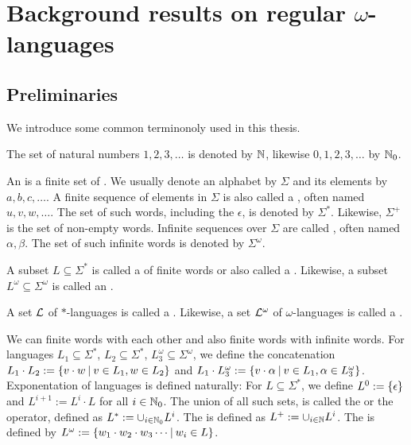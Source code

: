 \section{Background results on regular $\omega$-languages}

\subsection{Preliminaries}
We introduce some common terminonoly used in this thesis.

The set of natural numbers $1,2,3,\dots$ is denoted by $\mathbb{N}$, likewise $0,1,2,3,\dots$ by $\mathbb{N}_0$.

An  is a finite set of . We usually denote an alphabet by $\Sigma$ and its elements by $a, b, c, \dots$. A finite sequence of elements in $\Sigma$ is also called a , often named $u, v, w, \dots$. The set of such words, including the  $\epsilon$, is denoted by $\Sigma^*$. Likewise, $\Sigma^+$ is the set of non-empty words. Infinite sequences over $\Sigma$ are called , often named $\alpha, \beta$. The set of such infinite words is denoted by $\Sigma^\omega$.

A subset $L \subseteq \Sigma^*$ is called a  of finite words or also called a . Likewise, a subset $L^\omega \subseteq \Sigma^\omega$ is called an .

A set $\mathcal{L}$ of $*$-languages is called a . Likewise, a set $\mathcal{L}^\omega$ of $\omega$-languages is called a .

We can  finite words with each other and also finite words with infinite words. For languages $L_1 \subseteq \Sigma^*$, $L_2 \subseteq \Sigma^*$, $L^\omega_3 \subseteq \Sigma^\omega$, we define the concatenation $L_1 \cdot L_2 := \Set{v \cdot w}{v \in L_1, w \in L_2}$ and $L_1 \cdot L^\omega_3 := \Set{v \cdot \alpha}{v \in L_1, \alpha \in L^\omega_3}$. Exponentation of languages is defined naturally: For $L \subseteq \Sigma^*$, we define $L^0 := \Set{\epsilon}$ and $L^{i+1} := L^i \cdot L$ for all $i \in \mathbb{N}_0$. The union of all such sets, is called the  or the  operator, defined as $L^* := \cup_{i\in\mathbb{N}_0} L^i$. The  is defined as $L^+ := \cup_{i\in\mathbb{N}} L^i$. The  is defined by $L^\omega := \Set{w_1 \cdot w_2 \cdot w_3 \cdots}{w_i \in L}$.

